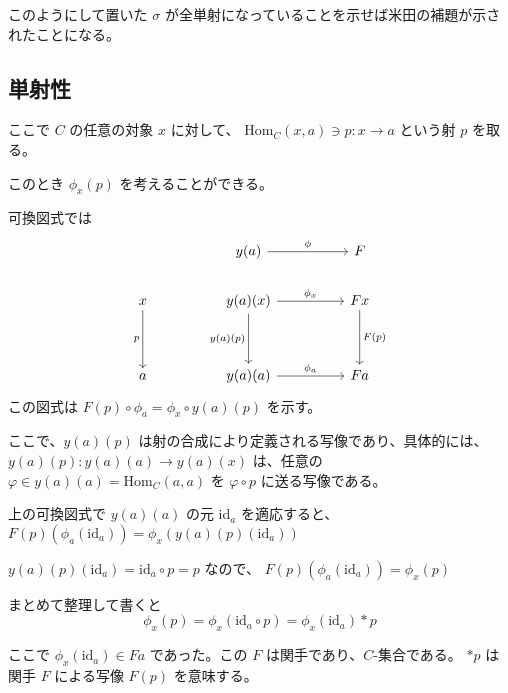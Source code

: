 \documentclass[uplatex,a4j,12pt,dvipdfmx]{jsarticle}
\begin{document}
このようにして置いた $\sigma$ が全単射になっていることを示せば米田の補題が示されたことになる。

\subsection{単射性}

ここで $C$ の任意の対象 $x$ に対して、
$\text{Hom}_{C}(x,a) \ni p: x \to a$ という射 $p$ を取る。

このとき $\phi_{x}(p)$ を考えることができる。

可換図式では
\[
	\begin{tikzcd}
		&  & y(a) \arrow[rr, "\phi"]                               &  & F                     \\
		x \arrow[dd, "p"'] &  & y(a)(x) \arrow[dd, "y(a)(p)"'] \arrow[rr, "\phi_{x}"] &  & Fx \arrow[dd, "F(p)"] \\
		&  &                                                       &  &                       \\
		a                  &  & y(a)(a) \arrow[rr, "\phi_{a}"]                        &  & Fa
	\end{tikzcd}
\]
この図式は $F(p) \circ \phi_{a} = \phi_{x} \circ y(a)(p)$ を示す。

ここで、$y(a)(p)$ は射の合成により定義される写像であり、具体的には、
$y(a)(p): y(a)(a) \to y(a)(x)$ は、任意の$\varphi \in y(a)(a) = \text{Hom}_{C}(a,a)$ を
$\varphi \circ p$ に送る写像である。

上の可換図式で $y(a)(a)$ の元 id$_{a}$ を適応すると、
$F(p)(\phi_{a}(\text{id}_{a})) = \phi_{x}(y(a)(p)(\text{id}_{a}))$

$y(a)(p)(\text{id}_{a}) = \text{id}_{a} \circ p = p$ なので、
$F(p)(\phi_{a}(\text{id}_{a})) = \phi_{x}(p)$

まとめて整理して書くと
\[
	\phi_{x}(p) = \phi_{x}( \text{id}_{a} \circ p) = \phi_{x}( \text{id}_{a} ) * p
\]

ここで $\phi_{x}( \text{id}_{a} ) \in Fa$ であった。この $F$ は関手であり、$C$-集合である。
$*p$ は 関手 $F$ による写像 $F(p)$ を意味する。
\end{document}
